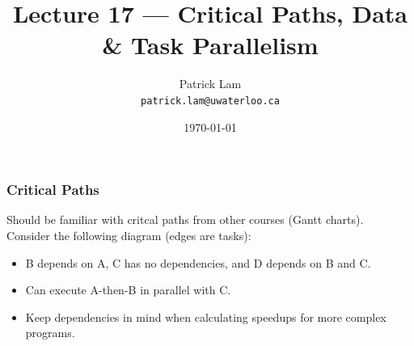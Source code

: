 

\title{Lecture 17 --- Critical Paths, Data \& Task Parallelism }

\author{Patrick Lam \\ \small \texttt{patrick.lam@uwaterloo.ca}}
\date{\today}




\begin{frame}
  \titlepage

 \end{frame}



\begin{frame}
  \frametitle{Critical Paths}

  

  Should be familiar with critcal paths from other courses (Gantt charts).\\[1em]

  Consider the following diagram (edges are tasks):

\begin{center}
\end{center}

  \begin{itemize}
    \item B depends on A, C has no dependencies, and D depends on B and C.
    \item Can execute A-then-B in parallel with C.
    \item Keep dependencies in mind when calculating speedups for more
      complex programs.
  \end{itemize}
  
\end{frame}

